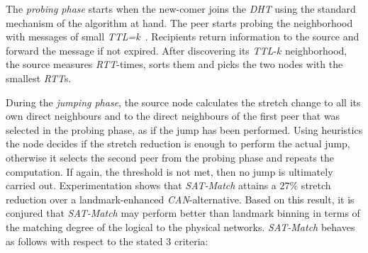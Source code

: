 The \emph{probing phase} starts when the new-comer joins the \emph{DHT} 
using the standard mechanism of the algorithm at hand. 
The peer starts probing the neighborhood with 
messages of small \emph{TTL=k}~\cite{jiang_lightflood_2008}. 
Recipients return information to the source and forward the message 
if not expired. 
After discovering its \emph{TTL}-$k$ neighborhood, 
the source measures \emph{RTT}-times, sorts them
and picks the two nodes with the smallest \emph{RTT}s.

During the \emph{jumping phase}, the source node calculates the 
stretch change to all its own direct neighbours and to the direct neighbours
of the first peer that was selected in the probing phase, as if
the jump has been performed. Using heuristics the node decides if the stretch
reduction is enough to perform the actual jump, otherwise it selects the
second peer from the probing phase and repeats the computation. If again, the
threshold is not met, then no jump is ultimately carried out.
Experimentation shows that \emph{SAT-Match} 
attains a $27\%$ stretch reduction over 
a landmark-enhanced \emph{CAN}-alternative.
Based on this result, it is conjured that \emph{SAT-Match} 
may perform better than landmark binning in terms of the matching degree
of the logical to the physical networks. 
\emph{SAT-Match} behaves as follows with respect to the stated $3$ criteria:
%
